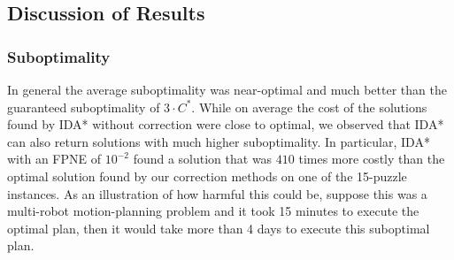 \documentclass[letterpaper]{article}
\begin{document}
\subsection{Discussion of Results}




\subsubsection{Suboptimality}
In general the average suboptimality was near-optimal and much better than the guaranteed suboptimality of $3\cdot C^*$. While on average the cost of the solutions found by IDA* without correction were close to optimal, we observed that IDA* can also return solutions with much higher suboptimality. In particular, IDA* with an FPNE of $10^{-2}$ found a solution that was $410$ times more costly than %
the optimal solution found by our correction methods 
on one of the 15-puzzle instances. As an illustration of how harmful this could be, suppose this was a multi-robot motion-planning problem and it took 15 minutes to execute the optimal plan, then it would take more than 4 days to execute this suboptimal plan. %
\end{document}
